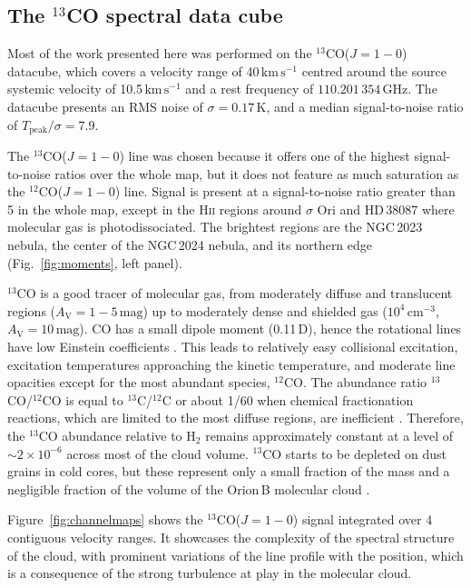 \documentclass[structabstract]{aa}
\newcommand{\eg}{{\em e.g.,}}
\newcommand{\emm}[1]{\ensuremath{#1}}
\newcommand{\emr}[1]{\emm{\mathrm{#1}}}
\newcommand{\unit}[1]{\emr{\,#1}}
\newcommand{\Av}{\emm{A_\emr{V}}}
\newcommand{\GHz}{\unit{GHz}}
\newcommand{\pccm}{\unit{cm^{-3}}} %
\newcommand{\magn}{\unit{mag}}
\newcommand{\K}{\unit{K}}
\newcommand{\kms}{\unit{km\,s^{-1}}}
\begin{document}
\subsection{The $^{13}$CO spectral data cube}

Most of the work presented here was performed on the $^{13}$CO($J=1-0$) datacube, which covers a velocity range of 40\kms{} centred around the source systemic velocity of 10.5\kms{} and a rest frequency of $110.201\,354\GHz$. The datacube presents an RMS noise of $\sigma = 0.17\K$, and a median signal-to-noise ratio of $T_\emr{peak}/\sigma = 7.9$.

The $^{13}$CO($J=1-0$) line was chosen because it offers one of the highest signal-to-noise ratios over the whole map, but it does not feature as much saturation as the $^{12}$CO($J=1-0$) line. Signal is present at a signal-to-noise ratio greater than 5 in the whole map, except in the \textsc{Hii} regions around $\sigma$ Ori and HD\,38087 where molecular gas is photodissociated. The brightest regions are the NGC\,2023 nebula, the center of the NGC\,2024 nebula, and its northern edge (Fig.~\ref{fig:moments}, left panel).

$^{13}$CO is a good tracer of molecular gas, from moderately diffuse and translucent regions ($\Av = 1-5\magn$) up to moderately dense and shielded gas ($10^{4}\pccm$, $\Av = 10\magn$). CO has a small dipole moment (0.11\,D), hence the rotational lines have low Einstein coefficients \citep[\eg{}][]{mangum15}. This leads to relatively easy collisional excitation, excitation temperatures approaching the kinetic temperature, and moderate line opacities except for the most abundant species, $^{12}$CO. The abundance ratio $^{13}$CO/$^{12}$CO is equal to $^{13}$C/$^{12}$C or about 1/60 when chemical fractionation reactions, which are limited to the most diffuse regions, are inefficient \citep{wilson94}. Therefore, the $^{13}$CO abundance relative to H$_2$ remains approximately constant at a level of $\sim 2 \times 10^{-6}$ \citep{dickman78} across most of the cloud volume. $^{13}$CO starts to be depleted on dust grains in cold cores, but these represent only a small fraction of the mass and a negligible fraction of the volume of the Orion\,B molecular cloud \citep{kirk16}.

Figure~\ref{fig:channelmaps} shows the $^{13}$CO($J=1-0$) signal integrated over 4 contiguous velocity ranges. It showcases the complexity of the spectral structure of the cloud, with prominent variations of the line profile with the position, which is a consequence of the strong turbulence at play in the molecular cloud. 
\end{document}
